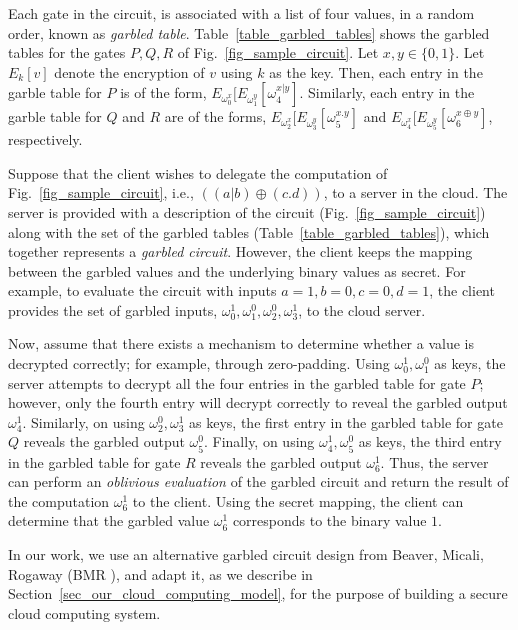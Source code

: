 \documentclass[10pt,journal,cspaper,compsoc]{IEEEtran}
\begin{document}
Each gate in the circuit, is associated with a list of four values, in a random order, known as {\em garbled table}. Table~\ref{table_garbled_tables} shows the garbled tables for the gates $P,Q,R$ of Fig.~\ref{fig_sample_circuit}. Let $x,y\in\{0,1\}$. Let $E_{k}[v]$ denote the encryption of $v$ using $k$ as the key. Then, each entry in the garble table for $P$ is of the form, $E_{\omega_0^x}[E_{\omega_1^y}[\omega_4^{x|y}]$. Similarly, each entry in the garble table for $Q$ and $R$ are of the forms, $E_{\omega_2^x}[E_{\omega_3^y}[\omega_5^{x.y}]$ and $E_{\omega_4^x}[E_{\omega_5^y}[\omega_6^{x\oplus y}]$, respectively.


Suppose that the client wishes to delegate the computation of Fig.~\ref{fig_sample_circuit}, i.e., $((a|b)\oplus (c.d))$, to a server in the cloud. The server is provided with a description of the circuit (Fig.~\ref{fig_sample_circuit}) along with the set of the garbled tables (Table~\ref{table_garbled_tables}), which together represents a {\em garbled circuit}. However, the client keeps the mapping between the garbled values and the underlying binary values as secret. For example, to evaluate the circuit with inputs $a=1,b=0,c=0,d=1$, the client provides the set of garbled inputs, $\omega_0^1,\omega_1^0,\omega_2^0,\omega_3^1$, to the cloud server.


Now, assume that there exists a mechanism to determine whether a value is decrypted correctly; for example, through zero-padding. Using $\omega_0^1,\omega_1^0$ as keys, the server attempts to decrypt all the four entries in the garbled table for gate $P$; however, only the fourth entry will decrypt correctly to reveal the garbled output $\omega_4^1$. Similarly, on using $\omega_2^0,\omega_3^1$ as keys, the first entry in the garbled table for gate $Q$ reveals the garbled output $\omega_5^0$. Finally, on using $\omega_4^1,\omega_5^0$ as keys, the third entry in the garbled table for gate $R$ reveals the garbled output $\omega_6^1$. Thus, the server can perform an {\em oblivious evaluation} of the garbled circuit and return the result of the computation $\omega_6^1$ to the client. Using the secret mapping, the client can determine that the garbled value $\omega_6^1$ corresponds to the binary value $1$.


In our work, we use an alternative garbled circuit design from Beaver, Micali, Rogaway (BMR \cite{beaver90,rogaway91}), and adapt it, as we describe in Section~\ref{sec_our_cloud_computing_model}, for the purpose of building a secure cloud computing system.
\end{document}
